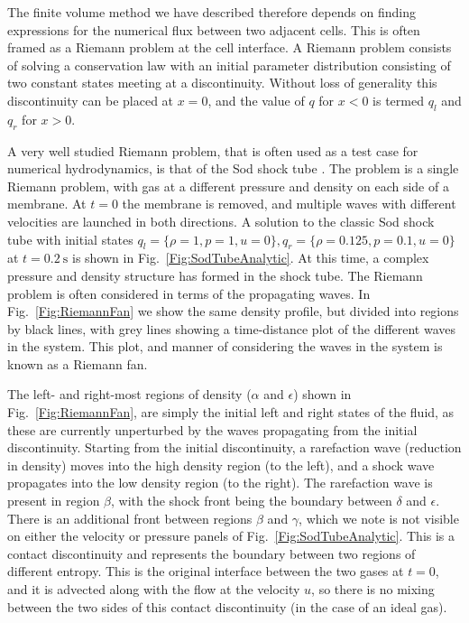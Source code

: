 The finite volume method we have described therefore depends on finding expressions for the numerical flux between two adjacent cells.
This is often framed as a Riemann problem at the cell interface.
A Riemann problem consists of solving a conservation law with an initial parameter distribution consisting of two constant states meeting at a discontinuity.
Without loss of generality this discontinuity can be placed at $x=0$, and the value of $q$ for $x<0$ is termed $q_l$ and $q_r$ for $x>0$.

A very well studied Riemann problem, that is often used as a test case for numerical hydrodynamics, is that of the Sod shock tube \citep{Sod1978}.
The problem is a single Riemann problem, with gas at a different pressure and density on each side of a membrane.
At $t=0$ the membrane is removed, and multiple waves with different velocities are launched in both directions.
A solution to the classic Sod shock tube with initial states $q_l = \{\rho=1, p=1, u=0\}, q_r = \{\rho=0.125, p=0.1, u=0\}$ at $t=\SI{0.2}{\second}$ is shown in Fig.~\ref{Fig:SodTubeAnalytic}.
At this time, a complex pressure and density structure has formed in the shock tube.
The Riemann problem is often considered in terms of the propagating waves.
In Fig.~\ref{Fig:RiemannFan} we show the same density profile, but divided into regions by black lines, with grey lines showing a time-distance plot of the different waves in the system.
This plot, and manner of considering the waves in the system is known as a Riemann fan.

The left- and right-most regions of density ($\alpha$ and $\epsilon$) shown in Fig.~\ref{Fig:RiemannFan}, are simply the initial left and right states of the fluid, as these are currently unperturbed by the waves propagating from the initial discontinuity.
Starting from the initial discontinuity, a rarefaction wave (reduction in density) moves into the high density region (to the left), and a shock wave propagates into the low density region (to the right).
The rarefaction wave is present in region $\beta$, with the shock front being the boundary between $\delta$ and $\epsilon$.
There is an additional front between regions $\beta$ and $\gamma$, which we note is not visible on either the velocity or pressure panels of Fig.~\ref{Fig:SodTubeAnalytic}.
This is a contact discontinuity and represents the boundary between two regions of different entropy.
This is the original interface between the two gases at $t=0$, and it is advected along with the flow at the velocity $u$, so there is no mixing between the two sides of this contact discontinuity (in the case of an ideal gas).

